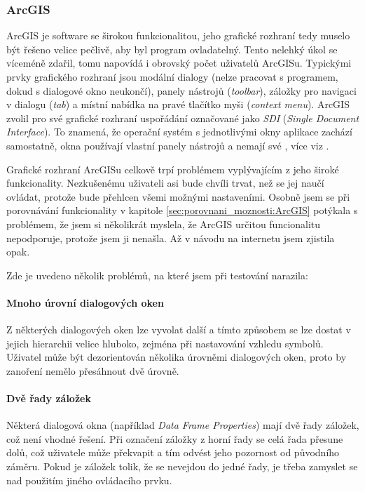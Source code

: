 \documentclass[a4paper,12pt,draft]{article}
\begin{document}
{\subsubsection{ArcGIS}
ArcGIS je software se širokou funkcionalitou, jeho grafické rozhraní tedy
muselo být řešeno velice pečlivě, aby byl program ovladatelný. Tento
nelehký úkol se víceméně zdařil, tomu napovídá i obrovský počet
uživatelů ArcGISu. Typickými prvky grafického rozhraní jsou modální
dialogy (nelze pracovat s programem, dokud s dialogové okno neukončí),
panely nástrojů (\emph{toolbar}), záložky pro navigaci v dialogu (\emph{tab}) a
místní
nabídka na pravé tlačítko myši (\emph{context menu}). ArcGIS zvolil pro své 
grafické rozhraní uspořádání označované jako \emph{SDI} (\emph{Single Document
Interface}). To znamená, že operační systém s jednotlivými okny aplikace
zachází samostatně, okna používají vlastní panely nástrojů a nemají
své , více viz \cite{wiki_SDI}.

Grafické rozhraní ArcGISu celkově trpí problémem vyplývajícím z jeho
široké funkcionality. Nezkušenému uživateli asi bude chvíli trvat,
 než se jej naučí ovládat, protože bude přehlcen všemi možnými
 nastaveními. Osobně jsem se při porovnávání funkcionality v kapitole
 \ref{sec:porovnani_moznosti:ArcGIS} potýkala s problémem, že jsem si
 několikrát myslela, že ArcGIS určitou funcionalitu nepodporuje, protože
 jsem ji nenašla. Až v návodu na internetu \cite{ArcGIS_help} jsem zjistila
opak.

Zde je uvedeno několik problémů, na které jsem při testování narazila:

\paragraph*{Mnoho úrovní dialogových oken} Z některých dialogových oken
lze vyvolat další a tímto způsobem se lze dostat v jejich hierarchii velice
hluboko, zejména při nastavování vzhledu symbolů.  Uživatel může být
dezorientován několika úrovněmi dialogových oken, proto by zanoření
nemělo přesáhnout dvě úrovně.

\paragraph*{Dvě řady záložek} Některá dialogová okna (například
\emph{Data Frame Properties}) mají dvě řady záložek, což není vhodné
řešení. Při označení záložky z horní řady se celá řada přesune
dolů, což uživatele může překvapit a tím odvést jeho pozornost od
původního záměru. Pokud je záložek tolik, že se nevejdou do jedné
řady, je třeba zamyslet se nad použitím jiného ovládacího prvku.

}
\end{document}
